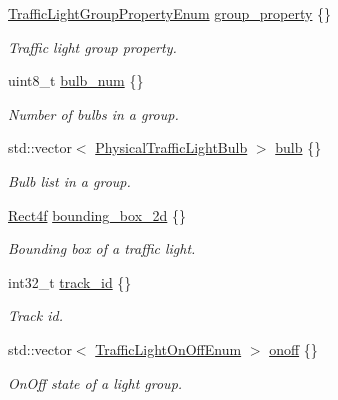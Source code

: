 \begin{DoxyCompactItemize}
\hyperlink{structmaf__perception__interface_1_1TrafficLightGroupPropertyEnum}{Traffic\+Light\+Group\+Property\+Enum} \hyperlink{structmaf__perception__interface_1_1PhysicalTrafficLightSingleFrame_aba3a81f7bd280ef30276beba5b37f721}{group\+\_\+property} \{\}
\begin{DoxyCompactList}\small\item\em Traffic light group property. \end{DoxyCompactList}\item 
uint8\+\_\+t \hyperlink{structmaf__perception__interface_1_1PhysicalTrafficLightSingleFrame_abc0f67863aa55171c53d0eb0ca366dd0}{bulb\+\_\+num} \{\}
\begin{DoxyCompactList}\small\item\em Number of bulbs in a group. \end{DoxyCompactList}\item 
std\+::vector$<$ \hyperlink{structmaf__perception__interface_1_1PhysicalTrafficLightBulb}{Physical\+Traffic\+Light\+Bulb} $>$ \hyperlink{structmaf__perception__interface_1_1PhysicalTrafficLightSingleFrame_acaad9ffe0eb73d57e65b31107f95f2d0}{bulb} \{\}
\begin{DoxyCompactList}\small\item\em Bulb list in a group. \end{DoxyCompactList}\item 
\hyperlink{structmaf__perception__interface_1_1Rect4f}{Rect4f} \hyperlink{structmaf__perception__interface_1_1PhysicalTrafficLightSingleFrame_adc8030aa03213c58830b4b35e1346ce2}{bounding\+\_\+box\+\_\+2d} \{\}
\begin{DoxyCompactList}\small\item\em Bounding box of a traffic light. \end{DoxyCompactList}\item 
int32\+\_\+t \hyperlink{structmaf__perception__interface_1_1PhysicalTrafficLightSingleFrame_aa2b5f97388d7c0a9d66de311a6a6aae1}{track\+\_\+id} \{\}
\begin{DoxyCompactList}\small\item\em Track id. \end{DoxyCompactList}\item 
std\+::vector$<$ \hyperlink{structmaf__perception__interface_1_1TrafficLightOnOffEnum}{Traffic\+Light\+On\+Off\+Enum} $>$ \hyperlink{structmaf__perception__interface_1_1PhysicalTrafficLightSingleFrame_ab3fe868c9f1179c77cc94f5c7ee5bc8f}{onoff} \{\}
\begin{DoxyCompactList}\small\item\em On\+Off state of a light group. \end{DoxyCompactList}\item 

\end{DoxyCompactItemize}

